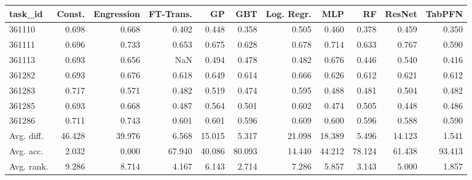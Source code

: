\begin{tabular}{lrrrrrrrrrr}
\toprule
task\_id & Const. & Engression & FT-Trans. & GP & GBT & Log. Regr. & MLP & RF & ResNet & TabPFN \\
\midrule
361110 & 0.698 & 0.668 & 0.402 & 0.448 & 0.358 & 0.505 & 0.460 & 0.378 & 0.459 & 0.350 \\
361111 & 0.696 & 0.733 & 0.653 & 0.675 & 0.628 & 0.678 & 0.714 & 0.633 & 0.767 & 0.590 \\
361113 & 0.693 & 0.656 & NaN & 0.494 & 0.478 & 0.482 & 0.676 & 0.446 & 0.540 & 0.416 \\
361282 & 0.693 & 0.676 & 0.618 & 0.649 & 0.614 & 0.666 & 0.626 & 0.612 & 0.621 & 0.612 \\
361283 & 0.717 & 0.571 & 0.482 & 0.519 & 0.474 & 0.595 & 0.488 & 0.481 & 0.504 & 0.482 \\
361285 & 0.693 & 0.668 & 0.487 & 0.564 & 0.501 & 0.602 & 0.474 & 0.505 & 0.448 & 0.486 \\
361286 & 0.711 & 0.743 & 0.601 & 0.601 & 0.596 & 0.609 & 0.600 & 0.596 & 0.588 & 0.590 \\
Avg. diff. & 46.428 & 39.976 & 6.568 & 15.015 & 5.317 & 21.098 & 18.389 & 5.496 & 14.123 & 1.541 \\
Avg. acc. & 2.032 & 0.000 & 67.940 & 40.086 & 80.093 & 14.440 & 44.212 & 78.124 & 61.438 & 93.413 \\
Avg. rank. & 9.286 & 8.714 & 4.167 & 6.143 & 2.714 & 7.286 & 5.857 & 3.143 & 5.000 & 1.857 \\
\bottomrule
\end{tabular}
